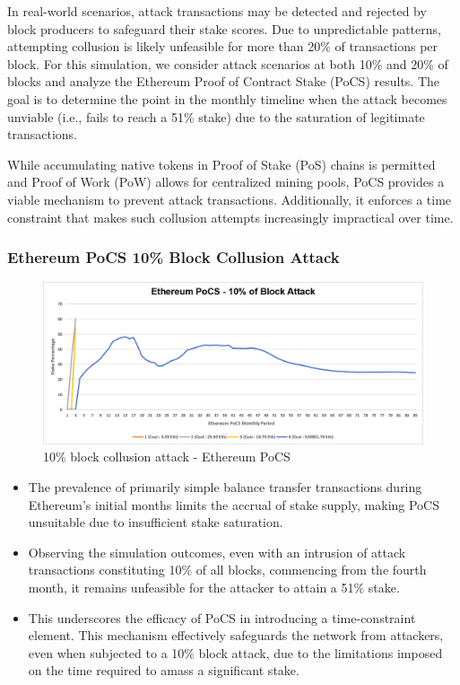 \documentclass{article}
\begin{document}
In real-world scenarios, attack transactions may be detected and rejected by block producers to safeguard their stake scores. Due to unpredictable patterns, attempting collusion is likely unfeasible for more than 20\% of transactions per block. For this simulation, we consider attack scenarios at both 10\% and 20\% of blocks and analyze the Ethereum Proof of Contract Stake (PoCS) results. The goal is to determine the point in the monthly timeline when the attack becomes unviable (i.e., fails to reach a 51\% stake) due to the saturation of legitimate transactions.

While accumulating native tokens in Proof of Stake (PoS) chains is permitted and Proof of Work (PoW) allows for centralized mining pools, PoCS provides a viable mechanism to prevent attack transactions. Additionally, it enforces a time constraint that makes such collusion attempts increasingly impractical over time.

\subsubsection{Ethereum PoCS 10\% Block Collusion Attack}

\begin{figure}[H]
    \centering
    \includegraphics[width=\textwidth]{./assets/10-of-block.png}
    \caption{10\% block collusion attack - Ethereum PoCS}
\end{figure}

\begin{itemize}
    \item The prevalence of primarily simple balance transfer transactions during Ethereum's initial months limits the accrual of stake supply, making PoCS unsuitable due to insufficient stake saturation.
    \item Observing the simulation outcomes, even with an intrusion of attack transactions constituting 10\% of all blocks, commencing from the fourth month, it remains unfeasible for the attacker to attain a 51\% stake.
    \item This underscores the efficacy of PoCS in introducing a time-constraint element. This mechanism effectively safeguards the network from attackers, even when subjected to a 10\% block attack, due to the limitations imposed on the time required to amass a significant stake.
\end{itemize}
\end{document}
